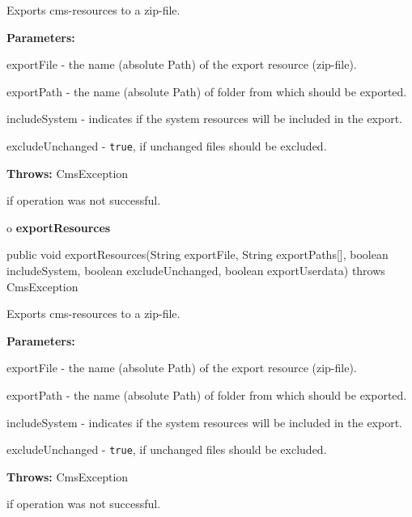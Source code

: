 \begin{description}
\htmlDD Exports cms-resources to a zip-file.

\begin{description}
\item {\bf Parameters:}

exportFile - the name (absolute Path) of the export resource (zip-file).

exportPath - the name (absolute Path) of folder from which should be exported.


includeSystem - indicates if the system resources will be included in the
export.

excludeUnchanged - {\tt true}, if unchanged files should be excluded.
\item {\bf Throws:} CmsException

if operation was not successful.
\end{description}

\end{description}

o {\bf exportResources}

\begin{PRE}
 public void exportResources(String exportFile,
                             String exportPaths[],
                             boolean includeSystem,
                             boolean excludeUnchanged,
                             boolean exportUserdata) throws CmsException
\end{PRE}

\begin{description}
\htmlDD Exports cms-resources to a zip-file.

\begin{description}
\item {\bf Parameters:}

exportFile - the name (absolute Path) of the export resource (zip-file).

exportPath - the name (absolute Path) of folder from which should be exported.


includeSystem - indicates if the system resources will be included in the
export.

excludeUnchanged - {\tt true}, if unchanged files should be excluded.
\item {\bf Throws:} CmsException

if operation was not successful.
\end{description}

\end{description}

